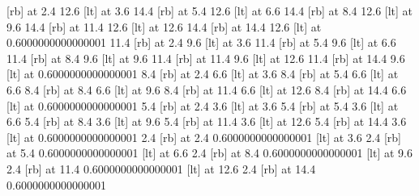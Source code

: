  [rb] at 2.4 12.6
 [lt] at 3.6 14.4
 [rb] at 5.4 12.6
 [lt] at 6.6 14.4
 [rb] at 8.4 12.6
 [lt] at 9.6 14.4
 [rb] at 11.4 12.6
 [lt] at 12.6 14.4
 [rb] at 14.4 12.6
 [lt] at 0.6000000000000001 11.4
 [rb] at 2.4 9.6
 [lt] at 3.6 11.4
 [rb] at 5.4 9.6
 [lt] at 6.6 11.4
 [rb] at 8.4 9.6
 [lt] at 9.6 11.4
 [rb] at 11.4 9.6
 [lt] at 12.6 11.4
 [rb] at 14.4 9.6
 [lt] at 0.6000000000000001 8.4
 [rb] at 2.4 6.6
 [lt] at 3.6 8.4
 [rb] at 5.4 6.6
 [lt] at 6.6 8.4
 [rb] at 8.4 6.6
 [lt] at 9.6 8.4
 [rb] at 11.4 6.6
 [lt] at 12.6 8.4
 [rb] at 14.4 6.6
 [lt] at 0.6000000000000001 5.4
 [rb] at 2.4 3.6
 [lt] at 3.6 5.4
 [rb] at 5.4 3.6
 [lt] at 6.6 5.4
 [rb] at 8.4 3.6
 [lt] at 9.6 5.4
 [rb] at 11.4 3.6
 [lt] at 12.6 5.4
 [rb] at 14.4 3.6
 [lt] at 0.6000000000000001 2.4
 [rb] at 2.4 0.6000000000000001
 [lt] at 3.6 2.4
 [rb] at 5.4 0.6000000000000001
 [lt] at 6.6 2.4
 [rb] at 8.4 0.6000000000000001
 [lt] at 9.6 2.4
 [rb] at 11.4 0.6000000000000001
 [lt] at 12.6 2.4
 [rb] at 14.4 0.6000000000000001
\endpicture
\bigskip
\vfil\eject
\vfil\eject\bye
